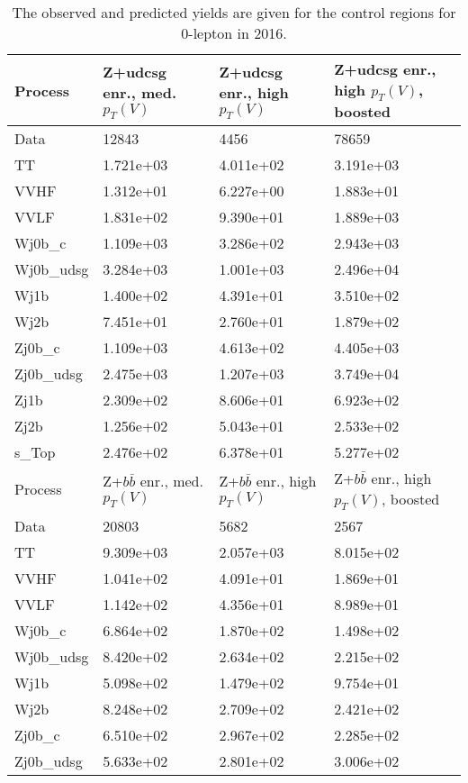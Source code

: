 \begin{table}
\centering
\caption[2016 0-lepton control region yields]{
                  The observed and predicted yields are given for the
                  control regions for 0-lepton in 2016.
                  }
{\footnotesize
\begin{tabularx}{0.8\textwidth}{|X|X|X|X|}
\hline
Process & Z+udcsg enr., med. $p_{T}(V)$ & Z+udcsg enr., high $p_{T}(V)$ & Z+udcsg enr., high $p_{T}(V)$, boosted \\
\hline
Data & 12843 & 4456 & 78659 \\
\hline
TT & 1.721e+03 & 4.011e+02 & 3.191e+03 \\
VVHF & 1.312e+01 & 6.227e+00 & 1.883e+01 \\
VVLF & 1.831e+02 & 9.390e+01 & 1.889e+03 \\
Wj0b\_c & 1.109e+03 & 3.286e+02 & 2.943e+03 \\
Wj0b\_udsg & 3.284e+03 & 1.001e+03 & 2.496e+04 \\
Wj1b & 1.400e+02 & 4.391e+01 & 3.510e+02 \\
Wj2b & 7.451e+01 & 2.760e+01 & 1.879e+02 \\
Zj0b\_c & 1.109e+03 & 4.613e+02 & 4.405e+03 \\
Zj0b\_udsg & 2.475e+03 & 1.207e+03 & 3.749e+04 \\
Zj1b & 2.309e+02 & 8.606e+01 & 6.923e+02 \\
Zj2b & 1.256e+02 & 5.043e+01 & 2.533e+02 \\
s\_Top & 2.476e+02 & 6.378e+01 & 5.277e+02 \\
\hline
\hline
Process & Z+$b\bar{b}$ enr., med. $p_{T}(V)$ & Z+$b\bar{b}$ enr., high $p_{T}(V)$ & Z+$b\bar{b}$ enr., high $p_{T}(V)$, boosted \\
\hline
Data & 20803 & 5682 & 2567 \\
\hline
TT & 9.309e+03 & 2.057e+03 & 8.015e+02 \\
VVHF & 1.041e+02 & 4.091e+01 & 1.869e+01 \\
VVLF & 1.142e+02 & 4.356e+01 & 8.989e+01 \\
Wj0b\_c & 6.864e+02 & 1.870e+02 & 1.498e+02 \\
Wj0b\_udsg & 8.420e+02 & 2.634e+02 & 2.215e+02 \\
Wj1b & 5.098e+02 & 1.479e+02 & 9.754e+01 \\
Wj2b & 8.248e+02 & 2.709e+02 & 2.421e+02 \\
Zj0b\_c & 6.510e+02 & 2.967e+02 & 2.285e+02 \\
Zj0b\_udsg & 5.633e+02 & 2.801e+02 & 3.006e+02 \\

\end{tabularx}}
\end{table}
